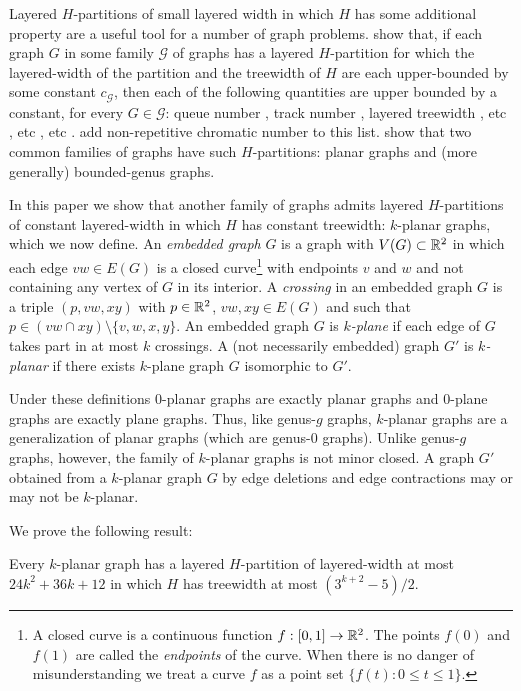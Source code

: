 \documentclass{patmorin}
\begin{document}
Layered $H$-partitions of small layered width in which $H$ has some additional property are a useful tool for a number of graph problems. \citet{dujmovic.joret.ea:planar} show that, if each graph $G$ in some family $\mathcal{G}$ of graphs has a layered $H$-partition for which the layered-width of the partition and the treewidth of $H$ are each upper-bounded by some constant $c_\mathcal{G}$, then each of the following quantities are upper bounded by a constant, for every $G\in\mathcal{G}$: queue number \cite{X}, track number \cite{X}, layered treewidth \cite{X}, etc \cite{X}, etc \cite{X}, etc \cite{X}. \citet{dujmovic.esperet.ea:planar} add non-repetitive chromatic number to this list.  \citet{dujmovic.joret.ea:planar} show that two common families of graphs have such $H$-partitions: planar graphs and (more generally) bounded-genus graphs.

In this paper we show that another family of graphs admits layered $H$-partitions of constant layered-width in which $H$ has constant treewidth: $k$-planar graphs, which we now define. An \emph{embedded graph} $G$ is a graph with $V(G)\subset\mathbb{R}^2$ in which each edge $vw\in E(G)$ is a closed curve\footnote{A closed curve is a continuous function $f:[0,1]\to \mathbb{R}^2$. The points $f(0)$ and $f(1)$ are called the \emph{endpoints} of the curve.  When there is no danger of misunderstanding we treat a curve $f$ as a point set $\{f(t):0\le t\le 1\}$.} with endpoints $v$ and $w$ and not containing any vertex of $G$ in its interior.  A \emph{crossing} in an embedded graph $G$ is a triple $(p,vw,xy)$ with $p\in\mathbb{R}^2$, $vw,xy\in E(G)$ and such that $p\in (vw\cap xy)\setminus\{v,w,x,y\}$. An embedded graph $G$ is \emph{$k$-plane} if each edge of $G$ takes part in at most $k$ crossings.  A (not necessarily embedded) graph $G'$ is \emph{$k$-planar} if there exists $k$-plane graph $G$ isomorphic to $G'$.  

Under these definitions $0$-planar graphs are exactly planar graphs and $0$-plane graphs are exactly plane graphs. Thus, like genus-$g$ graphs, $k$-planar graphs are a generalization of planar graphs (which are genus-$0$ graphs).  Unlike genus-$g$ graphs, however, the family of $k$-planar graphs is not minor closed. A graph $G'$ obtained from a $k$-planar graph $G$ by edge deletions and edge contractions may or may not be $k$-planar.

We prove the following result:
\begin{thm}
  Every $k$-planar graph has a layered $H$-partition of layered-width at most $24k^2 + 36k + 12$ in which $H$ has treewidth at most $(3^{k+2}-5)/2$.
\end{thm}
\end{document}
